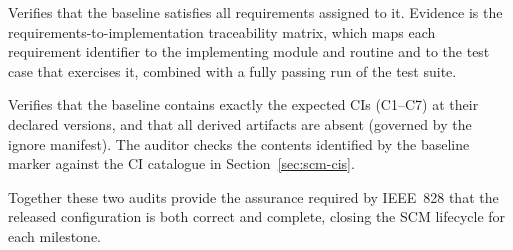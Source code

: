 \begin{description}[leftmargin=1.6cm, style=nextline]
  \item[Functional Configuration Audit (FCA)]
    Verifies that the baseline satisfies all requirements assigned to it. Evidence
    is the requirements-to-implementation traceability matrix, which maps each
    requirement identifier to the implementing module and routine and to the test
    case that exercises it, combined with a fully passing run of the test suite.

  \item[Physical Configuration Audit (PCA)]
    Verifies that the baseline contains exactly the expected CIs (C1--C7) at their
    declared versions, and that all derived artifacts are absent (governed by the
    ignore manifest). The auditor checks the contents identified by the baseline
    marker against the CI catalogue in Section~\ref{sec:scm-cis}.
\end{description}

Together these two audits provide the assurance required by IEEE~828 that the
released configuration is both correct and complete, closing the SCM lifecycle for
each milestone.
